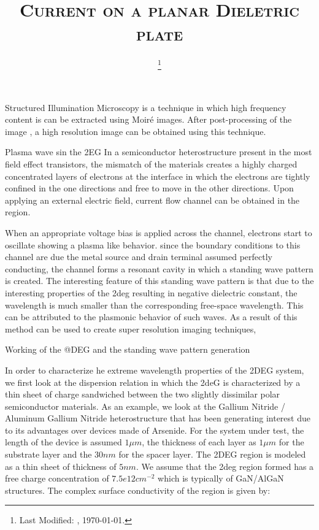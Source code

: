 \documentclass[11pt]{article}
\begin{document}
\title{\textsc{Current on a planar Dieletric plate}\\}
\date{\footnote{Last Modified: \currenttime, \today.}}
\maketitle

Structured Illumination Microscopy is a technique in which high frequency content is can be extracted using Moiré images. After post-processing of the image , a high resolution image can be obtained using this technique.


Plasma wave sin the 2EG
In a semiconductor heterostructure present in the most field effect transistors, the mismatch of the materials creates a highly charged concentrated layers of electrons at the interface in which the electrons are tightly confined in the one directions and free to move in the other directions. Upon applying an external electric field, current flow channel can be obtained in the region.

When an appropriate voltage bias is applied across the channel, electrons start to oscillate showing a plasma like behavior. since the boundary conditions to this channel are due the metal source and drain terminal assumed perfectly conducting, the channel forms a resonant cavity in which a standing wave pattern is created. The interesting feature of this standing wave pattern is that due to the interesting properties of the 2deg resulting in negative dielectric constant, the wavelength is much smaller than the corresponding free-space wavelength. This can be attributed to the plasmonic behavior of such waves. As a result of this method can be used to create super resolution imaging techniques,



Working of the @DEG and the standing wave pattern generation


In order to characterize he extreme wavelength properties of the 2DEG system, we first look at the dispersion relation in which the 2deG is characterized by a thin sheet of charge sandwiched between the two slightly dissimilar polar semiconductor materials. As an example, we look at the Gallium Nitride / Aluminum Gallium Nitride heterostructure that has been generating interest due to its advantages over devices made of Arsenide. For the system under test, the length of the device is assumed $1\mu m$, the thickness of each layer as $ 1 \mu m$ for the substrate layer and the $30 nm$ for the spacer layer. The 2DEG region is modeled as a thin sheet of thickness of $5 nm$. We assume that the 2deg region formed has a free charge concentration of $7.5e 12 cm^{-2}$ which is typically of GaN/AlGaN structures. The complex surface conductivity of the region is given by:
\end{document}
